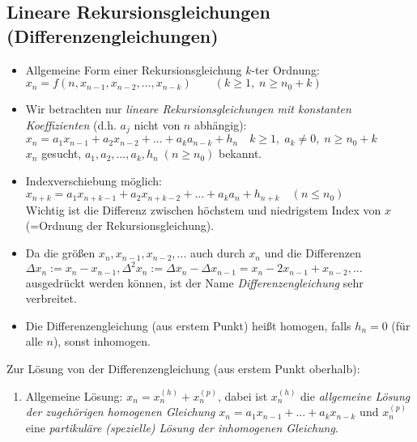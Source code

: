 \subsection{Lineare Rekursionsgleichungen (Differenzengleichungen)}
\begin{itemize}
\item Allgemeine Form einer Rekursionsgleichung $k$-ter Ordnung:\\
$x_n=f(n,x_{n-1},x_{n-2},...,x_{n-k}) \qquad (k \geq 1,\; n\geq n_0+k)$
\item Wir betrachten nur \emph{lineare Rekursionsgleichungen mit konstanten Koeffizienten} (d.h. $a_j$ nicht von $n$ abhängig):\\
$\boxed{x_n=a_1 x_{n-1}+a_2 x_{n-2}+...+a_k a_{n-k}+h_n}\quad k\geq 1, \; a_k \not = 0, \; n\geq n_0 +k$\\
$x_n$ gesucht, $a_1,a_2,...,a_k, h_n \; (n\geq n_0)$ bekannt.
\item Indexverschiebung möglich:\\
$\boxed{x_{n+k}=a_1 x_{n+k-1}+a_2 x_{n+k-2}+...+a_k a_{n}+h_{n+k}}\quad (n\leq n_0)$\\
Wichtig ist die Differenz zwischen höchstem und niedrigstem Index von $x$ (=Ordnung der Rekursionsgleichung).
\item Da die größen $x_n, x_{n-1}, x_{n-2},...$ auch durch $x_n$ und die Differenzen $\Delta x_n:=x_n-x_{n-1}, \Delta^2x_n:=\Delta x_n-\Delta x_{n-1}=x_n-2x_{n-1}+x_{n-2}, ...$ ausgedrückt werden können, ist der Name \emph{Differenzengleichung} sehr verbreitet.
\item Die Differenzengleichung (aus erstem Punkt) heißt homogen, falls $h_n=0$ (für alle $n$), sonst inhomogen.
\end{itemize}
Zur Lösung von der Differenzengleichung (aus erstem Punkt oberhalb):
\begin{enumerate}
\item Allgemeine Lösung: $\boxed{x_n=x_n^{(h)}+x_n^{(p)}}$, dabei ist $x_n^{(h)}$ die \emph{allgemeine Lösung der zugehörigen homogenen Gleichung} $\boxed{x_n=a_1 x_{n-1}+...+a_k x_{n-k}}$ und $x_n^{(p)}$ eine \emph{partikuläre (spezielle) Lösung der inhomogenen Gleichung}.
\end{enumerate}


 